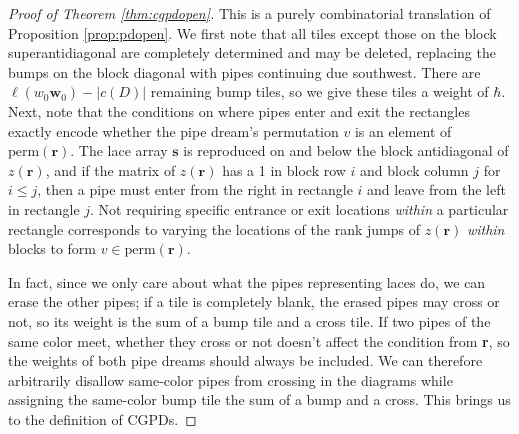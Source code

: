 \documentclass[reqno]{amsart}
\newcommand{\perm}{\textrm{perm}}
\numberwithin{equation}{section}
\theoremstyle{definition}
\theoremstyle{remark}
\begin{document}
\begin{proof}[Proof of Theorem \ref{thm:cgpdopen}]
This is a purely combinatorial translation of Proposition \ref{prop:pdopen}. We first note that all tiles except those on the block superantidiagonal are completely determined and may be deleted, replacing the bumps on the block diagonal with pipes continuing due southwest. There are $\ell(w_0\mathbf{w}_0)-|c(D)|$ remaining bump tiles, so we give these tiles a weight of $\hbar$. Next, note that the conditions on where pipes enter and exit the rectangles exactly encode whether the pipe dream's permutation $v$ is an element of $\perm(\mathbf{r})$. The lace array $\mathbf{s}$ is reproduced on and below the block antidiagonal of $z(\mathbf{r})$, and if the matrix of $z(\mathbf{r})$ has a 1 in block row $i$ and block column $j$ for $i \leq j$, then a pipe must enter from the right in rectangle $i$ and leave from the left in rectangle $j$.
Not requiring specific entrance or exit locations \emph{within} a particular rectangle corresponds to varying the locations of the rank jumps of $z(\mathbf{r})$ \emph{within} blocks to form $v \in \perm(\mathbf{r})$.

In fact, since we only care about what the pipes representing laces do, we can erase the other pipes; if a tile is completely blank, the erased pipes may cross or not, so its weight is the sum of a bump tile and a cross tile. If two pipes of the same color meet, whether they cross or not doesn't affect the condition from \textbf{r}, so the weights of both pipe dreams should always be included. We can therefore arbitrarily disallow same-color pipes from crossing in the diagrams while assigning the same-color bump tile the sum of a bump and a cross. This brings us to the definition of CGPDs.
\end{proof}
\end{document}
